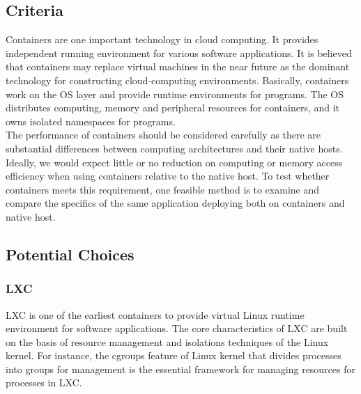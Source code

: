 \documentclass[letterpaper,10pt]{article}
\begin{document}
	\subsection{Criteria}
  Containers are one important technology in cloud computing. It provides independent running environment for various software applications. It is believed that containers may replace virtual machines in the near future as the dominant technology for constructing cloud-computing environments. Basically, containers work on the OS layer and provide runtime environments for programs. The OS distributes computing, memory and peripheral resources for containers, and it owns isolated namespaces for programs.\\
  The performance of containers should be considered carefully as there are substantial differences between computing architectures and their native hosts. Ideally, we would expect little or no reduction on computing or memory access efficiency when using containers relative to the native host. To test whether containers meets this requirement, one feasible method is to examine and compare the specifics of the same application deploying both on containers and native host.

	\subsection{Potential Choices}
		\subsubsection{LXC}
    LXC is one of the earliest containers to provide virtual Linux runtime environment for software applications. The core characteristics of LXC are built on the basis of resource management and isolations techniques of the Linux kernel. For instance, the cgroups feature of Linux kernel that divides processes into groups for management is the essential framework for managing resources for processes in LXC.
\end{document}
